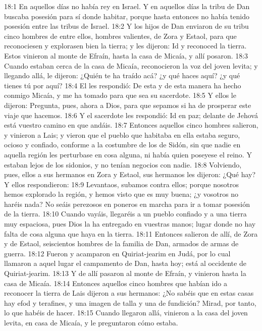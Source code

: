 18:1 En aquellos días no había rey en Israel. Y en aquellos días la tribu de Dan buscaba posesión para sí donde habitar, porque hasta entonces no había tenido posesión entre las tribus de Israel.  
18:2 Y los hijos de Dan enviaron de su tribu cinco hombres de entre ellos, hombres valientes, de Zora y Estaol, para que reconociesen y explorasen bien la tierra; y les dijeron: Id y reconoced la tierra. Estos vinieron al monte de Efraín, hasta la casa de Micaía, y allí posaron.  
18:3 Cuando estaban cerca de la casa de Micaía, reconocieron la voz del joven levita; y llegando allá, le dijeron: ¿Quién te ha traído acá? ¿y qué haces aquí? ¿y qué tienes tú por aquí?  
18:4 El les respondió: De esta y de esta manera ha hecho conmigo Micaía, y me ha tomado para que sea su sacerdote.  
18:5 Y ellos le dijeron: Pregunta, pues, ahora a Dios, para que sepamos si ha de prosperar este viaje que hacemos.  
18:6 Y el sacerdote les respondió: Id en paz; delante de Jehová está vuestro camino en que andáis.  
18:7 Entonces aquellos cinco hombres salieron, y vinieron a Lais; y vieron que el pueblo que habitaba en ella estaba seguro, ocioso y confiado, conforme a la costumbre de los de Sidón, sin que nadie en aquella región les perturbase en cosa alguna, ni había quien poseyese el reino. Y estaban lejos de los sidonios, y no tenían negocios con nadie.  
18:8 Volviendo, pues, ellos a sus hermanos en Zora y Estaol, sus hermanos les dijeron: ¿Qué hay? Y ellos respondieron:  
18:9 Levantaos, subamos contra ellos; porque nosotros hemos explorado la región, y hemos visto que es muy buena; ¿y vosotros no haréis nada? No seáis perezosos en poneros en marcha para ir a tomar posesión de la tierra.  
18:10 Cuando vayáis, llegaréis a un pueblo confiado y a una tierra muy espaciosa, pues Dios la ha entregado en vuestras manos; lugar donde no hay falta de cosa alguna que haya en la tierra.  
18:11 Entonces salieron de allí, de Zora y de Estaol, seiscientos hombres de la familia de Dan, armados de armas de guerra.  
18:12 Fueron y acamparon en Quiriat-jearim en Judá, por lo cual llamaron a aquel lugar el campamento de Dan, hasta hoy; está al occidente de Quiriat-jearim.  
18:13 Y de allí pasaron al monte de Efraín, y vinieron hasta la casa de Micaía.  
18:14 Entonces aquellos cinco hombres que habían ido a reconocer la tierra de Lais dijeron a sus hermanos: ¿No sabéis que en estas casas hay efod y terafines, y una imagen de talla y una de fundición? Mirad, por tanto, lo que habéis de hacer.  
18:15 Cuando llegaron allá, vinieron a la casa del joven levita, en casa de Micaía, y le preguntaron cómo estaba.  
